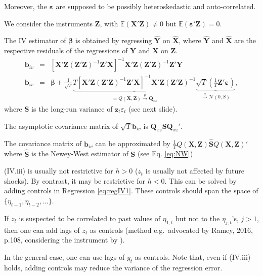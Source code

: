 \documentclass[
  12pt,
]{book}
\theoremstyle{definition}
\theoremstyle{definition}
\theoremstyle{definition}
\theoremstyle{definition}
\theoremstyle{remark}
\begin{document}
Moreover, the \(\boldsymbol\varepsilon\) are supposed to be possibly heteroskedastic and auto-correlated.

We consider the instruments \(\mathbf{Z}\), with \(\mathbb{E}(\mathbf{X}'\mathbf{Z}) \ne 0\) but \(\mathbb{E}(\boldsymbol\varepsilon'\mathbf{Z}) = 0\).

The IV estimator of \(\boldsymbol\beta\) is obtained by regressing \(\hat{\mathbf{Y}}\) on \(\hat{\mathbf{X}}\), where \(\hat{\mathbf{Y}}\) and \(\hat{\mathbf{X}}\) are the respective residuals of the regressions of \(\mathbf{Y}\) and \(\mathbf{X}\) on \(\mathbf{Z}\).
\begin{eqnarray*}
\mathbf{b}_{iv} &=& [\mathbf{X}'\mathbf{Z}(\mathbf{Z}'\mathbf{Z})^{-1}\mathbf{Z}'\mathbf{X}]^{-1}\mathbf{X}'\mathbf{Z}(\mathbf{Z}'\mathbf{Z})^{-1}\mathbf{Z}'\mathbf{Y}\\
\mathbf{b}_{iv} &=& \boldsymbol\beta + \frac{1}{\sqrt{T}}\underbrace{T[\mathbf{X}'\mathbf{Z}(\mathbf{Z}'\mathbf{Z})^{-1}\mathbf{Z}'\mathbf{X}]^{-1}\mathbf{X}'\mathbf{Z}(\mathbf{Z}'\mathbf{Z})^{-1}}_{=Q(\mathbf{X},\mathbf{Z}) \overset{p}{\rightarrow} \mathbf{Q}_{xz}}\underbrace{\sqrt{T}\left(\frac{1}{T}\mathbf{Z}'\boldsymbol\varepsilon\right)}_{\overset{d}{\rightarrow} \mathcal{N}(0,S)},
\end{eqnarray*}
where \(\mathbf{S}\) is the long-run variance of \(\mathbf{z}_t\varepsilon_t\) (see next slide).

The asymptotic covariance matrix of \(\sqrt{T}\mathbf{b}_{iv}\) is \(\mathbf{Q}_{xz} \mathbf{S} \mathbf{Q}_{xz}'\).

The covariance matrix of \(\mathbf{b}_{iv}\) can be approximated by \(\frac{1}{T}Q(\mathbf{X},\mathbf{Z})\hat{\mathbf{S}}Q(\mathbf{X},\mathbf{Z})'\) where \(\hat{\mathbf{S}}\) is the Newey-West estimator of \(\mathbf{S}\) (see Eq. \eqref{eq:NW})

(IV.iii) is usually not restrictive for \(h>0\) (\(z_t\) is usually not affected by future shocks). By contrast, it may be restrictive for \(h<0\). This can be solved by adding controls in Regression \eqref{eq:regIV1}. These controls should span the space of \(\{\eta_{t-1},\eta_{t-2},\dots\}\).

If \(z_t\) is suspected to be correlated to past values of \(\eta_{1,t}\) but not to the \(\eta_{j,t}\)'s, \(j>1\), then one can add lags of \(z_t\) as controls (method e.g.~advocated by Ramey, 2016, p.108, considering the instrument by \citet{Gertler_Karadi_2015}).

In the general case, one can use lags of \(y_t\) as controls. Note that, even if (IV.iii) holds, adding controls may reduce the variance of the regression error.
\end{document}
